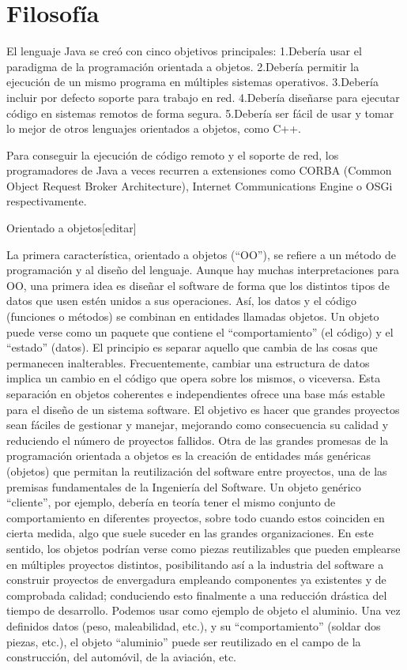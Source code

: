 \documentclass[11pt,a4paper]{book}
\begin{document}
			\chapter{Filosofía}
												El lenguaje Java se creó con cinco objetivos principales:
	\bigskip
							1.Debería usar el paradigma de la programación orientada a objetos.
	\bigskip
							2.Debería permitir la ejecución de un mismo programa en múltiples sistemas operativos.
	\bigskip
							3.Debería incluir por defecto soporte para trabajo en red.
	\bigskip
							4.Debería diseñarse para ejecutar código en sistemas remotos de forma segura.
	\bigskip
							5.Debería ser fácil de usar y tomar lo mejor de otros lenguajes orientados a objetos, como C++.
	\bigskip
							
	\bigskip
							Para conseguir la ejecución de código remoto y el soporte de red, los programadores de Java a veces recurren a extensiones como CORBA (Common Object Request Broker Architecture), Internet Communications Engine o OSGi respectivamente.
	\bigskip
							
	\bigskip
							Orientado a objetos[editar]
	\bigskip
							
	\bigskip
							La primera característica, orientado a objetos (“OO”), se refiere a un método de programación y al diseño del lenguaje. Aunque hay muchas interpretaciones para OO, una primera idea es diseñar el software de forma que los distintos tipos de datos que usen estén unidos a sus operaciones. Así, los datos y el código (funciones o métodos) se combinan en entidades llamadas objetos. Un objeto puede verse como un paquete que contiene el “comportamiento” (el código) y el “estado” (datos). El principio es separar aquello que cambia de las cosas que permanecen inalterables. Frecuentemente, cambiar una estructura de datos implica un cambio en el código que opera sobre los mismos, o viceversa. Esta separación en objetos coherentes e independientes ofrece una base más estable para el diseño de un sistema software. El objetivo es hacer que grandes proyectos sean fáciles de gestionar y manejar, mejorando como consecuencia su calidad y reduciendo el número de proyectos fallidos. Otra de las grandes promesas de la programación orientada a objetos es la creación de entidades más genéricas (objetos) que permitan la reutilización del software entre proyectos, una de las premisas fundamentales de la Ingeniería del Software. Un objeto genérico “cliente”, por ejemplo, debería en teoría tener el mismo conjunto de comportamiento en diferentes proyectos, sobre todo cuando estos coinciden en cierta medida, algo que suele suceder en las grandes organizaciones. En este sentido, los objetos podrían verse como piezas reutilizables que pueden emplearse en múltiples proyectos distintos, posibilitando así a la industria del software a construir proyectos de envergadura empleando componentes ya existentes y de comprobada calidad; conduciendo esto finalmente a una reducción drástica del tiempo de desarrollo. Podemos usar como ejemplo de objeto el aluminio. Una vez definidos datos (peso, maleabilidad, etc.), y su “comportamiento” (soldar dos piezas, etc.), el objeto “aluminio” puede ser reutilizado en el campo de la construcción, del automóvil, de la aviación, etc.
	\bigskip
							
\end{document}
